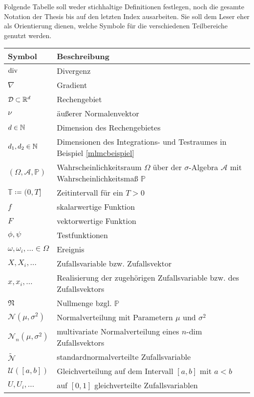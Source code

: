 Folgende Tabelle soll weder stichhaltige Definitionen festlegen, noch die gesamte Notation der Thesis bis auf den letzten Index ausarbeiten. Sie soll dem Leser eher als Orientierung dienen, welche Symbole für die verschiedenen Teilbereiche genutzt werden.

\begin{longtable}[c]{ p{} p{}}
	\hline
	Symbol    & Beschreibung   \\
	\hline
	$ \operatorname{div} $ & Divergenz \\
	$ \nabla $ & Gradient \\
	$ \mathcal{D} \subset \mathbb{R}^d$      & Rechengebiet       \\
	$ \nu $ & äußerer Normalenvektor \\
	$ d \in \mathbb{N} $      & Dimension des Rechengebietes        \\
	$ d_1, d_2 \in \mathbb{N} $ & Dimensionen des Integrations- und Testraumes in Beispiel \ref{mlmcbeispiel}  \\
	$ (\Omega,\mathcal{A},\mathbb{P}) $       & Wahrscheinlichkeitsraum $ \Omega $ über der $ \sigma $-Algebra $ \mathcal{A} $ mit Wahrscheinlichkeitsmaß $ \mathbb{P} $       \\
	$ \mathbb{T} \coloneqq  (0,T]  $  &  Zeitintervall für ein $ T>0 $       \\
	$ f $ & skalarwertige Funktion \\
	$ F $ & vektorwertige Funktion \\
	$ \phi , \psi $ & Testfunktionen \\
	$ \omega ,\omega_i , \dots \in \Omega $ & Ereignis \\
	$ X , X_i , \dots $ & Zufallsvariable bzw. Zufallsvektor \\
	$ x , x_i , \dots $ & Realisierung der zugehörigen Zufallsvariable bzw. des Zufallsvektors \\
	$ \mathfrak{N} $ & Nullmenge bzgl. $ \mathbb{P} $ \\
	$ \mathcal{N}(\mu,\sigma^2) $ & Normalverteilung mit Parametern $ \mu $ und $ \sigma^2 $ \\
	$ \mathcal{N}_n(\mu,\sigma^2) $ & multivariate Normalverteilung eines $ n $-dim Zufallsvektors\\
	$\widetilde{\mathcal{N}}$ & standardnormalverteilte Zufallsvariable \\
	$ \mathcal{U}([a,b]) $ & Gleichverteilung auf dem Intervall $ [a,b] $ mit $ a<b $ \\
	$ U,U_i,\dots $ &  auf $ [0,1] $  gleichverteilte Zufallsvariablen \\

\end{longtable}
